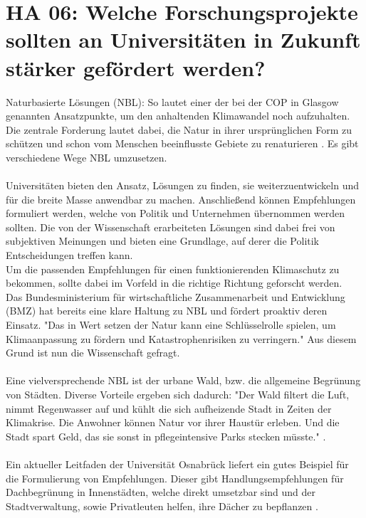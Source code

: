 \section{HA 06: Welche Forschungsprojekte sollten an Universitäten in Zukunft stärker gefördert werden?}
  Naturbasierte Lösungen (NBL): So lautet einer der bei der COP in Glasgow genannten Ansatzpunkte, um den anhaltenden Klimawandel noch aufzuhalten. Die zentrale Forderung lautet dabei, die Natur in ihrer ursprünglichen Form zu schützen und schon vom Menschen beeinflusste Gebiete zu renaturieren \cite{wahnbaeck_nature-based_2021}. Es gibt verschiedene Wege NBL umzusetzen.\\\\
  Universitäten bieten den Ansatz, Lösungen zu finden, sie weiterzuentwickeln und für die breite Masse anwendbar zu machen. Anschließend können Empfehlungen formuliert werden, welche von Politik und Unternehmen übernommen werden sollten. Die von der Wissenschaft erarbeiteten Lösungen sind dabei frei von subjektiven Meinungen und bieten eine Grundlage, auf derer die Politik Entscheidungen treffen kann.\\
  Um die passenden Empfehlungen für einen funktionierenden Klimaschutz zu bekommen, sollte dabei im Vorfeld in die richtige Richtung geforscht werden.\\
  Das Bundesministerium für wirtschaftliche Zusammenarbeit und Entwicklung (BMZ) hat bereits eine klare Haltung zu NBL und fördert proaktiv deren Einsatz. "Das in Wert setzen der Natur kann eine Schlüsselrolle spielen, um Klimaanpassung zu fördern und Katastrophenrisiken zu verringern." \cite{bundesministerium_fur_wirtschaftliche_zusammenarbeit_und_entwicklung_naturbasierte_2021} Aus diesem Grund ist nun die Wissenschaft gefragt.\\\\
  Eine vielversprechende NBL ist der urbane Wald, bzw. die allgemeine Begrünung von Städten. Diverse Vorteile ergeben sich dadurch: "Der Wald filtert die Luft, nimmt Regenwasser auf und kühlt die sich aufheizende Stadt in Zeiten der Klimakrise. Die Anwohner können Natur vor ihrer Haustür erleben. Und die Stadt spart Geld, das sie sonst in pflegeintensive Parks stecken müsste." \cite{wahnbaeck_nature-based_2021}.\\\\
  Ein aktueller Leitfaden der Universität Osnabrück liefert ein gutes Beispiel für die Formulierung von Empfehlungen. Dieser gibt Handlungsempfehlungen für Dachbegrünung in Innenstädten, welche direkt umsetzbar sind und der Stadtverwaltung, sowie Privatleuten helfen, ihre Dächer zu bepflanzen \cite{schroder_extensive_2020}.\\
